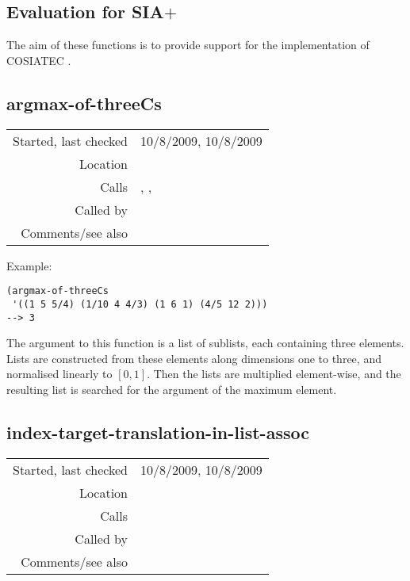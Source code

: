 \subsection{Evaluation for SIA$+$}\label{sec:evaluation-for-SIA+}

The aim of these functions is to provide support for
the implementation of COSIATEC
\citep{meredith2003,forth2009}.


\subsection*{argmax-of-threeCs}\label{fun:argmax-of-threeCs}

\vspace{0.3cm}
\begin{tabular}{r|p{8cm}}
Started, last checked & 10/8/2009, 10/8/2009 \\
Location & \nameref{sec:evaluation-for-SIA+} \\
Calls & \nameref{fun:multiply-two-lists}, \nameref{fun:max-argmax},\newline \nameref{fun:normalise-0-1} \\
Called by & \\
Comments/see also &
\end{tabular}

\vspace{0.5cm}
\noindent Example:
\begin{verbatim}
(argmax-of-threeCs
 '((1 5 5/4) (1/10 4 4/3) (1 6 1) (4/5 12 2)))
--> 3
\end{verbatim}

\noindent The argument to this function is a list of
sublists, each containing three elements. Lists are
constructed from these elements along dimensions one
to three, and normalised linearly to $[0, 1]$. Then
the lists are multiplied element-wise, and the
resulting list is searched for the argument of the
maximum element.


\subsection*{index-target-translation-in-list-assoc}\label{fun:index-target-translation-in-list-assoc}

\vspace{0.3cm}
\begin{tabular}{r|p{8cm}}
Started, last checked & 10/8/2009, 10/8/2009 \\
Location & \nameref{sec:evaluation-for-SIA+} \\
Calls & \nameref{fun:test-translation} \\
Called by & \nameref{fun:number-of-targets-translation-in-list-assoc} \\
Comments/see also &
\end{tabular}

